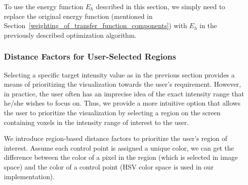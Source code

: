 To use the energy function $ E_{h} $ described in this section, we simply need to replace the original energy function (mentioned in Section~\ref{weighting_of_transfer_function_components}) with $ E_{h} $ in the previously described optimization algorithm.



\subsubsection{Distance Factors for User-Selected Regions}


Selecting a specific target intensity value as in the previous section provides a means of prioritizing the visualization towards the user's requirement. However, in practice, the user often has an imprecise idea of the exact intensity range that he/she wishes to focus on. Thus, we provide a more intuitive option that allows the user to prioritize the visualization by selecting a region on the screen containing voxels in the intensity range of interest to the user.

We introduce region-based distance factors to prioritize the user's region of interest.
Assume each control point is assigned a unique color, we can get the difference between the color of a pixel in the region (which is selected in image space) and the color of a control point (HSV color space is used in our implementation).

